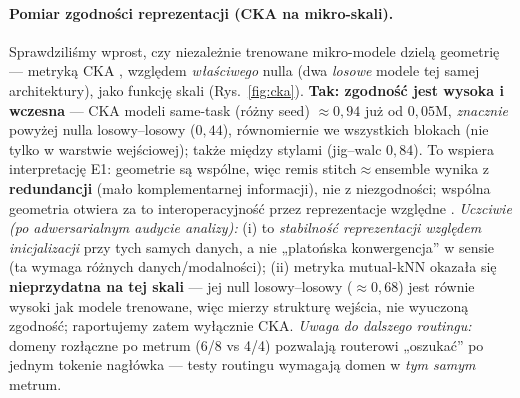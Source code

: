 \documentclass[11pt]{article}
\begin{document}
\paragraph{Pomiar zgodności reprezentacji (CKA na mikro-skali).} Sprawdziliśmy wprost, czy niezależnie trenowane mikro-modele dzielą geometrię --- metryką CKA \cite{cka}, względem \emph{właściwego} nulla (dwa \emph{losowe} modele tej samej architektury), jako funkcję skali (Rys.~\ref{fig:cka}). \textbf{Tak: zgodność jest wysoka i wczesna} --- CKA modeli same-task (różny seed) $\approx0{,}94$ już od $0{,}05$M, \emph{znacznie} powyżej nulla losowy--losowy ($0{,}44$), równomiernie we wszystkich blokach (nie tylko w warstwie wejściowej); także między stylami (jig--walc $0{,}84$). To wspiera interpretację E1: geometrie są wspólne, więc remis stitch$\approx$ensemble wynika z \textbf{redundancji} (mało komplementarnej informacji), nie z niezgodności; wspólna geometria otwiera za to interoperacyjność przez reprezentacje względne \cite{relreps}. \emph{Uczciwie (po adwersarialnym audycie analizy):} (i) to \emph{stabilność reprezentacji względem inicjalizacji} przy tych samych danych, a nie „platońska konwergencja'' w sensie \cite{platonic} (ta wymaga różnych danych/modalności); (ii) metryka mutual-kNN okazała się \textbf{nieprzydatna na tej skali} --- jej null losowy--losowy ($\approx0{,}68$) jest równie wysoki jak modele trenowane, więc mierzy strukturę wejścia, nie wyuczoną zgodność; raportujemy zatem wyłącznie CKA. \emph{Uwaga do dalszego routingu:} domeny rozłączne po metrum (6/8 vs 4/4) pozwalają routerowi „oszukać'' po jednym tokenie nagłówka --- testy routingu wymagają domen w \emph{tym samym} metrum.
\end{document}
